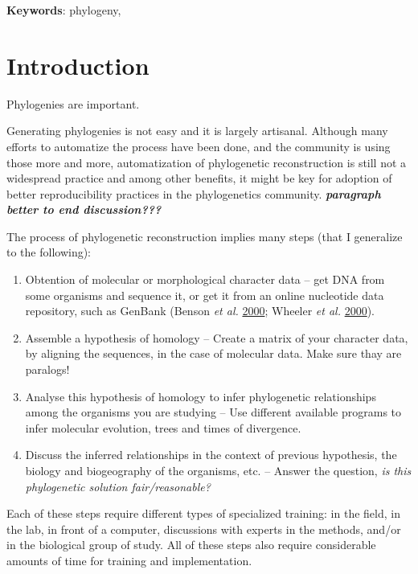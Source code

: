 \documentclass[]{article}
\providecommand{\tightlist}{%
  \setlength{\itemsep}{0pt}\setlength{\parskip}{0pt}}
\begin{document}
\textbf{Keywords}: phylogeny,

\newpage

\hypertarget{introduction}{%
\section{Introduction}\label{introduction}}

Phylogenies are important.

Generating phylogenies is not easy and it is largely artisanal. Although many efforts to automatize the process have been done, and the community is using those more and more, automatization of phylogenetic reconstruction is still not a widespread practice and among other benefits, it might be key for adoption of better reproducibility practices in the phylogenetics community. \textbf{\emph{paragraph better to end discussion??? }}

The process of phylogenetic reconstruction implies many steps (that I generalize to the following):

\begin{enumerate}
\def\labelenumi{\arabic{enumi}.}
\tightlist
\item
  Obtention of molecular or morphological character data -- get DNA from some organisms
  and sequence it, or get it from an online nucleotide data repository, such as GenBank (Benson \emph{et al.} \protect\hyperlink{ref-benson2000genbank}{2000}; Wheeler \emph{et al.} \protect\hyperlink{ref-wheeler2000database}{2000}).
\item
  Assemble a hypothesis of homology -- Create a matrix of your character data, by
  aligning the sequences, in the case of molecular data. Make sure thay are paralogs!
\item
  Analyse this hypothesis of homology to infer phylogenetic relationships among
  the organisms you are studying -- Use different available programs to infer molecular
  evolution, trees and times of divergence.
\item
  Discuss the inferred relationships in the context of previous hypothesis, the
  biology and biogeography of the organisms, etc. -- Answer the question, \emph{is this phylogenetic solution fair/reasonable?}
\end{enumerate}

Each of these steps require different types of specialized training: in the field,
in the lab, in front of a computer, discussions with experts in the methods, and/or in the biological group of study.
All of these steps also require considerable amounts of time for training and implementation.
\end{document}
